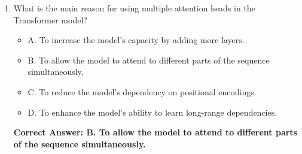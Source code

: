 \begin{figure*}
\begin{tcolorbox}[width=\textwidth,fontupper=\footnotesize,title=Repeated Baseline Questions - Continued]
\begin{enumerate}
    \item What is the main reason for using multiple attention heads in the Transformer model?
    \begin{itemize}
        \item A. To increase the model's capacity by adding more layers.
        \item B. To allow the model to attend to different parts of the sequence simultaneously.
        \item C. To reduce the model's dependency on positional encodings.
        \item D. To enhance the model's ability to learn long-range dependencies.
    \end{itemize}
    \textbf{Correct Answer: B. To allow the model to attend to different parts of the sequence simultaneously.}
\end{enumerate}

\end{tcolorbox}
\end{figure*}

